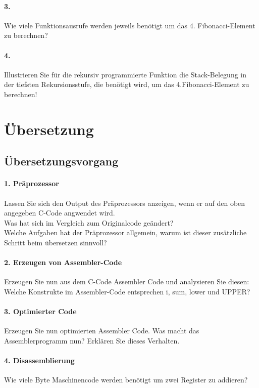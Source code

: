 \documentclass[paper=a4, fontsize=11pt]{scrartcl}
\numberwithin{equation}{section}
\numberwithin{figure}{section}
\numberwithin{table}{section}
\begin{document}
\paragraph{3.}
Wie viele Funktionsausrufe werden jeweils benötigt um das 4. Fibonacci-Element zu berechnen?

\paragraph{4.}
Illustrieren Sie für die rekursiv programmierte Funktion die Stack-Belegung in der tiefsten Rekursionsstufe, die benötigt wird, um das 4.Fibonacci-Element zu berechnen!

\section{Übersetzung}
\subsection{Übersetzungsvorgang}

\paragraph{1. Präprozessor}
Lassen Sie sich den Output des Präprozessors anzeigen, wenn er auf den oben angegeben C-Code angwendet wird. \\
Was hat sich im Vergleich zum Originalcode geändert? \\
Welche Aufgaben hat der Präprozessor allgemein, warum ist dieser zusätzliche Schritt beim übersetzen sinnvoll?

\paragraph{2. Erzeugen von Assembler-Code}
Erzeugen Sie nun aus dem C-Code Assembler Code und analysieren Sie diesen: Welche Konstrukte im Assembler-Code entsprechen i, sum, lower und UPPER?

\paragraph{3. Optimierter Code}
Erzeugen Sie nun optimierten Assembler Code. Was macht das Assemblerprogramm nun? Erklären Sie dieses Verhalten.

\paragraph{4. Disassemblierung}
Wie viele Byte Maschinencode werden benötigt um zwei Register zu addieren?
\end{document}
